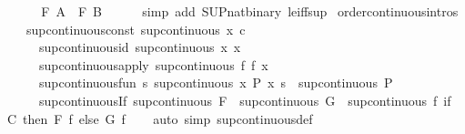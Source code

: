 \begin{isabellebody}
\ \ \isamarkupfalse%
\ \isamarkupfalse%
\ {\isachardoublequoteopen}F\ A\ {\isasymle}\ F\ B{\isachardoublequoteclose}\isanewline
\ \ \ \ \isamarkupfalse%
\ {\isacharparenleft}simp\ add{\isacharcolon}\ SUP{\isacharunderscore}nat{\isacharunderscore}binary\ le{\isacharunderscore}iff{\isacharunderscore}sup{\isacharparenright}\isanewline
{}\isamarkupfalse%
%
\endisatagproof
{\isafoldproof}%
%
\isadelimproof
\isanewline
%
\endisadelimproof
\isanewline
{}\isamarkupfalse%
\ {\isacharbrackleft}order{\isacharunderscore}continuous{\isacharunderscore}intros{\isacharbrackright}{\isacharcolon}\isanewline
\ \ \ sup{\isacharunderscore}continuous{\isacharunderscore}const{\isacharcolon}\ {\isachardoublequoteopen}sup{\isacharunderscore}continuous\ {\isacharparenleft}{\isasymlambda}x{\isachardot}\ c{\isacharparenright}{\isachardoublequoteclose}\isanewline
\ \ \ \ \ sup{\isacharunderscore}continuous{\isacharunderscore}id{\isacharcolon}\ {\isachardoublequoteopen}sup{\isacharunderscore}continuous\ {\isacharparenleft}{\isasymlambda}x{\isachardot}\ x{\isacharparenright}{\isachardoublequoteclose}\isanewline
\ \ \ \ \ sup{\isacharunderscore}continuous{\isacharunderscore}apply{\isacharcolon}\ {\isachardoublequoteopen}sup{\isacharunderscore}continuous\ {\isacharparenleft}{\isasymlambda}f{\isachardot}\ f\ x{\isacharparenright}{\isachardoublequoteclose}\isanewline
\ \ \ \ \ sup{\isacharunderscore}continuous{\isacharunderscore}fun{\isacharcolon}\ {\isachardoublequoteopen}{\isacharparenleft}{\isasymAnd}s{\isachardot}\ sup{\isacharunderscore}continuous\ {\isacharparenleft}{\isasymlambda}x{\isachardot}\ P\ x\ s{\isacharparenright}{\isacharparenright}\ {\isasymLongrightarrow}\ sup{\isacharunderscore}continuous\ P{\isachardoublequoteclose}\isanewline
\ \ \ \ \ sup{\isacharunderscore}continuous{\isacharunderscore}If{\isacharcolon}\ {\isachardoublequoteopen}sup{\isacharunderscore}continuous\ F\ {\isasymLongrightarrow}\ sup{\isacharunderscore}continuous\ G\ {\isasymLongrightarrow}\ sup{\isacharunderscore}continuous\ {\isacharparenleft}{\isasymlambda}f{\isachardot}\ if\ C\ then\ F\ f\ else\ G\ f{\isacharparenright}{\isachardoublequoteclose}\isanewline
%
\isadelimproof
\ \ %
\endisadelimproof
%
\isatagproof
{}\isamarkupfalse%
\ {\isacharparenleft}auto\ simp{\isacharcolon}\ sup{\isacharunderscore}continuous{\isacharunderscore}def{\isacharparenright}%
\endisatagproof
{\isafoldproof}%
%
\isadelimproof
\isanewline
%
\endisadelimproof

\end{isabellebody}
